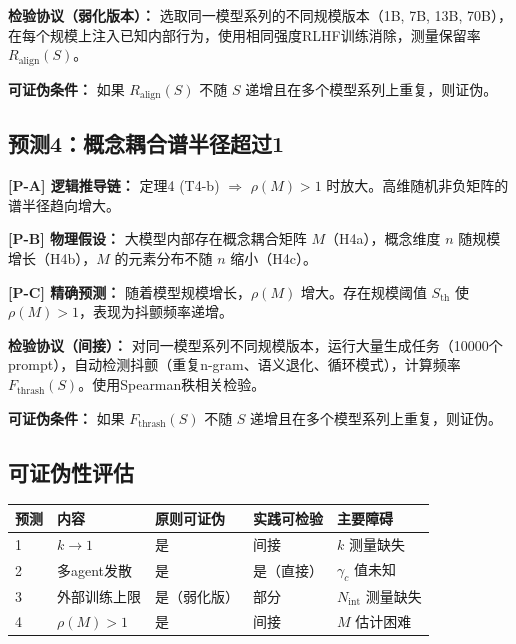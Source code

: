 \documentclass[12pt,a4paper]{article}
\theoremstyle{definition}
\newcommand{\Nint}{N_{\mathrm{int}}}
\newcommand{\gamc}{\gamma_c}
\begin{document}
\textbf{检验协议（弱化版本）：} 选取同一模型系列的不同规模版本（1B, 7B, 13B, 70B），在每个规模上注入已知内部行为，使用相同强度RLHF训练消除，测量保留率 $R_{\mathrm{align}}(S)$。

\textbf{可证伪条件：} 如果 $R_{\mathrm{align}}(S)$ 不随 $S$ 递增且在多个模型系列上重复，则证伪。

\subsection{预测4：概念耦合谱半径超过1}

\textbf{[P-A] 逻辑推导链：} 定理4 (T4-b) $\Rightarrow$ $\rho(M) > 1$ 时放大。高维随机非负矩阵的谱半径趋向增大。

\textbf{[P-B] 物理假设：} 大模型内部存在概念耦合矩阵 $M$（H4a），概念维度 $n$ 随规模增长（H4b），$M$ 的元素分布不随 $n$ 缩小（H4c）。

\textbf{[P-C] 精确预测：} 随着模型规模增长，$\rho(M)$ 增大。存在规模阈值 $S_{\mathrm{th}}$ 使 $\rho(M) > 1$，表现为抖颤频率递增。

\textbf{检验协议（间接）：} 对同一模型系列不同规模版本，运行大量生成任务（10000个prompt），自动检测抖颤（重复n-gram、语义退化、循环模式），计算频率 $F_{\mathrm{thrash}}(S)$。使用Spearman秩相关检验。

\textbf{可证伪条件：} 如果 $F_{\mathrm{thrash}}(S)$ 不随 $S$ 递增且在多个模型系列上重复，则证伪。

\subsection{可证伪性评估}

\begin{longtable}{p{} p{} p{} p{} p{}}
\toprule
预测 & 内容 & 原则可证伪 & 实践可检验 & 主要障碍 \\
\midrule
1 & $k \to 1$ & 是 & 间接 & $k$ 测量缺失 \\
2 & 多agent发散 & 是 & 是（直接） & $\gamc$ 值未知 \\
3 & 外部训练上限 & 是（弱化版） & 部分 & $\Nint$ 测量缺失 \\
4 & $\rho(M) > 1$ & 是 & 间接 & $M$ 估计困难 \\
\bottomrule
\end{longtable}

\end{document}
